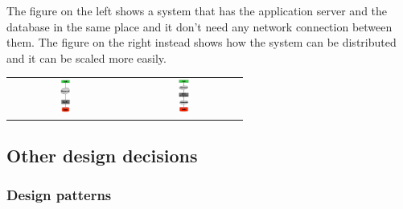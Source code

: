 	The figure on the left shows a system that has the application server and the database in the same place and it don't need any network connection between them. The figure on the right instead shows how the system can be distributed and it can be scaled more easily.
	\begin{center}
	    \begingroup
	    	\setlength{\tabcolsep}{30pt}
		    	\begin{tabular}{ c | c }
			    	\includegraphics[width=0.10\textwidth]{./images/architecture1.png} & 	
			    	\includegraphics[width=0.10\textwidth]{./images/architecture2.png}  \\ 
		    	\end{tabular} 
		\endgroup
	\end{center}	  	
\subsection{Other design decisions}
	\subsubsection{Design patterns}